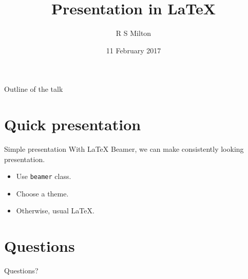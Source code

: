 \documentclass[11pt]{beamer}
\title{Presentation in \LaTeX}
\author{R S Milton}
\institute{
  Department of Computer Science\\
  SSN College of Engineering
}
\date{11 February 2017}
\begin{document}
\begin{frame}
  \titlepage
\end{frame}

\begin{frame}{Outline of the talk}
  \tableofcontents
\end{frame}


\section{Quick presentation}

\begin{frame}{Simple presentation}
  With LaTeX Beamer, we can make consistently looking
  presentation.
  \begin{itemize}
  \item Use \texttt{beamer} class.
  \item Choose a theme.
  \item Otherwise, usual \LaTeX.
  \end{itemize}
\end{frame}

\section{Questions}
\begin{frame}
  \vfill
  \begin{center}
    Questions?
  \end{center}
  \vfill
\end{frame}
\end{document}
